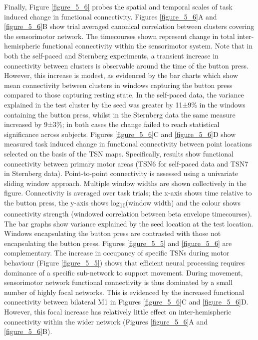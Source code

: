 Finally, Figure \ref{figure_5_6} probes the spatial and temporal scales of task induced change in functional connectivity. Figures \ref{figure_5_6}A and \ref{figure_5_6}B show trial averaged canonical correlation between clusters covering the sensorimotor network. The timecourses shown represent change in total inter-hemispheric functional connectivity within the sensorimotor system. Note that in both the self-paced and Sternberg experiments, a transient increase in connectivity between clusters is observable around the time of the button press. However, this increase is modest, as evidenced by the bar charts which show mean connectivity between clusters in windows capturing the button press compared to those capturing resting state. In the self-paced data, the variance explained in the test cluster by the seed was greater by 11±9\% in the windows containing the button press, whilst in the Sternberg data the same measure increased by 9±3\%; in both cases the change failed to reach statistical significance across subjects. Figures \ref{figure_5_6}C and \ref{figure_5_6}D show measured task induced change in functional connectivity between point locations selected on the basis of the TSN maps. Specifically, results show functional connectivity between primary motor areas (TSN6 for self-paced data and TSN7 in Sternberg data). Point-to-point connectivity is assessed using a univariate sliding window approach. Multiple window widths are shown collectively in the figure. Connectivity is averaged over task trials; the x-axis shows time relative to the button press, the y-axis shows log\textsubscript{10}(window width) and the colour shows connectivity strength (windowed correlation between beta envelope timecourses). The bar graphs show variance explained by the seed location at the test location. Windows encapsulating the button press are contrasted with those not encapsulating the button press.  Figures \ref{figure_5_5} and \ref{figure_5_6} are complementary. The increase in occupancy of specific TSNs during motor behaviour (Figure \ref{figure_5_5}) shows that efficient neural processing requires dominance of a specific sub-network to support movement. During movement, sensorimotor network functional connectivity is thus dominated by a small number of highly focal networks. This is evidenced by the increased functional connectivity between bilateral M1 in Figures \ref{figure_5_6}C and \ref{figure_5_6}D. However, this focal increase has relatively little effect on inter-hemispheric connectivity within the wider network (Figures \ref{figure_5_6}A and \ref{figure_5_6}B). 

